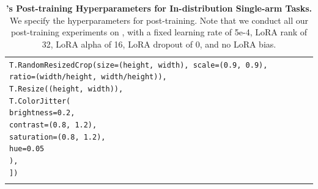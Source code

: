 \begin{table}[!htbp]
\begin{tabular}{l*{3}{>{\centering\arraybackslash}p{2.8cm}}}
{{\texttt{\hspace*{1em}T.RandomResizedCrop(size=(height, width), scale=(0.9, 0.9), ratio=(width/height, width/height)),}\\
\texttt{\hspace*{1em}T.Resize((height, width)),}\\
\texttt{\hspace*{1em}T.ColorJitter(}\\
\texttt{\hspace*{2em}brightness=0.2,}\\
\texttt{\hspace*{2em}contrast=(0.8, 1.2),}\\
\texttt{\hspace*{2em}saturation=(0.8, 1.2),}\\
\texttt{\hspace*{2em}hue=0.05}\\
\texttt{\hspace*{1em}),}\\
\texttt{])}
}} \\
\addlinespace[4pt]  
\bottomrule
\end{tabular}
\caption{\textbf{\molmoact's Post-training Hyperparameters for In-distribution Single-arm Tasks.} We specify the hyperparameters for \molmoact post-training. Note that we conduct all our post-training experiments on \molmoactd, with a fixed learning rate of 5e-4, LoRA rank of 32, LoRA alpha of 16, LoRA dropout of 0, and no LoRA bias.}
\label{tab:hyperparams_real_indist_singlearm}
\end{table}